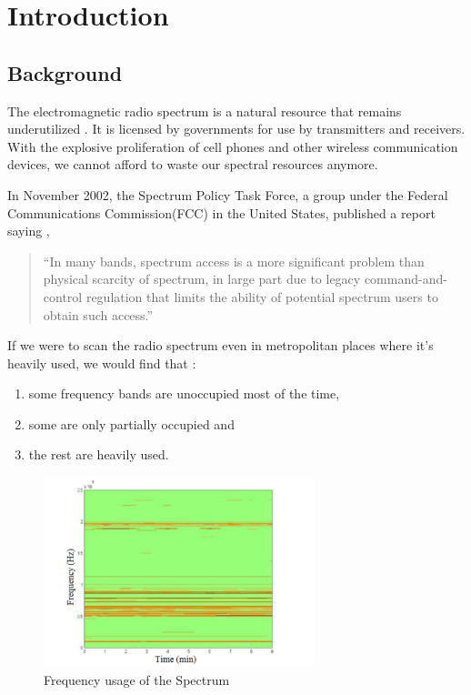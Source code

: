 \chapter{Introduction}
\section{Background}
The electromagnetic radio spectrum is a natural resource that remains 
underutilized \cite{haykin05}.
It is licensed by governments for use by transmitters and receivers.
With the explosive proliferation of cell phones and other wireless 
communication devices,
we cannot afford to waste our spectral resources anymore.

In November 2002, the Spectrum Policy Task Force, a group under the Federal
Communications Commission(FCC) in the United States, published a report saying
\cite{repFCC}, 
\begin{quote}
``In many bands, spectrum access is a more significant problem than physical 
scarcity of spectrum, in large part due to legacy command-and-control 
regulation that limits the ability of potential spectrum users to obtain such 
access.''
\end{quote}

If we were to scan the radio spectrum even in metropolitan places where it's
heavily used, 
we would find that \cite{staple04}:
\begin{enumerate}
	\item some frequency bands are unoccupied most of the time,
	\item some are only partially occupied and
	\item the rest are heavily used.
\end{enumerate}

\begin{figure}
\centering
\includegraphics[width=0.7\textwidth]{freqUsage}
\caption{Frequency usage of the Spectrum}
\label{freqUsage}
\end{figure}


